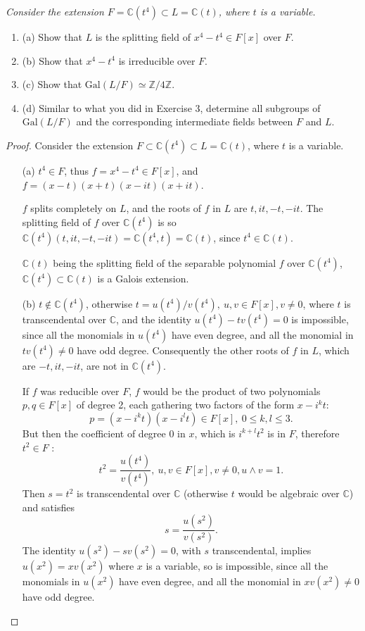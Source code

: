\documentclass[11pt,a4paper]{article}
\newcommand{\be} {\begin{enumerate}}
\newcommand{\ee} {\end{enumerate}}
\newcommand{\Z}{\mathbb{Z}}
\newcommand{\C}{\mathbb{C}}
\newcommand{\Gal}{\mathrm{Gal}}
\begin{document}
{\it Consider the extension $F = \C(t^4) \subset L = \C(t)$, where $t$ is a variable.
\be
\item[(a)] Show that $L$ is the splitting field of $x^4-t^4 \in F[x]$ over $F$.
\item[(b)] Show that $x^4 -t^4$ is irreducible over $F$.
\item[(c)] Show that $\Gal(L/F) \simeq \Z/4\Z$.
\item[(d)] Similar to what you did in Exercise 3, determine all subgroups of $\Gal(L/F)$ and the corresponding intermediate fields between $F$ and $L$.
\ee
}

\begin{proof}
Consider the extension $F \subset \C(t^4) \subset L=\C(t)$, where $t$ is a variable.
\begin{enumerate}
\vspace{0.5cm}
\item[(a)]
$t^4 \in F$, thus $f=x^4 - t^4 \in F[x]$, and $f = (x-t)(x+t)(x-it)(x+it)$.

$f$ splits completely on $L$, and the roots of $f$ in $L$ are $t, it,-t,-it$. The splitting field of $f$  over $\C(t^4)$ is so $\C(t^4)(t,it,-t,-it) = \C(t^4,t) = \C(t)$, since $t^4 \in \C(t)$.

$\C(t)$ being the splitting field of the separable polynomial $f$ over $\C(t^4)$, $\C(t^4) \subset \C(t)$ is a Galois extension.

\item[(b)] $t  \not \in \C(t^4)$, otherwise $t = u(t^4)/v(t^4),\ u,v \in F[x], v\neq 0$, where $t$ is transcendental over $\C$, and the identity $u(t^4) - t v(t^4) = 0$ is impossible, since all the monomials in $u(t^4)$ have even degree, and all the monomial in $tv(t^4)\neq 0$ have odd degree.  Consequently the other roots of $f$ in  $L$, which are $-t,it,-it$,  are not in $\C(t^4)$.

If  $f$ was reducible over $F$, $f$ would be the product of two polynomials $p,q \in F[x]$ of degree 2, each gathering two factors of the form $x-i^k t$:
$$p = (x -i^k t)(x-i^l t) \in F[x], \ 0 \leq k,l \leq 3.$$
But then the coefficient of degree 0 in $x$, which is $i^{k+l} t^2$ is in $ F$, therefore $t^2 \in F$ :
$$t^2 = \frac{u(t^4)}{v(t^4)}, \ u,v \in F[x], v\neq 0, u\wedge v=1.$$
Then  $s = t^2$ is transcendental over $\C$ (otherwise $t$ would be algebraic over $\C$) and satisfies
$$s = \frac{u(s^2)}{v(s^2)}.$$
The identity $u(s^2) -sv(s^2) = 0$, with $s$ transcendental, implies $u(x^2)  = x v(x^2)$ where $x$ is a variable, so is impossible, since all the monomials in $u(x^2)$ have even degree, and all the monomial in $xv(x^2)\neq 0$ have odd degree.


\end{enumerate}
\end{proof}
\end{document}
